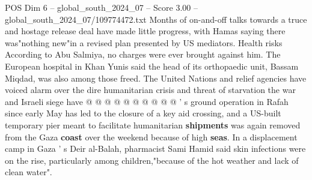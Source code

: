 \begin{textsample}{POS Dim 6 – global\_south\_2024\_07 – Score 3.00 – global\_south\_2024\_07/109774472.txt}
Months of on-and-off talks towards a truce and hostage release deal have made little progress, with Hamas saying there was"nothing new"in a revised plan presented by US mediators.
Health risks According to Abu Salmiya, no charges were ever brought against him.
The European hospital in Khan Yunis said the head of its orthopaedic unit, Bassam Miqdad, was also among those freed.
The United Nations and relief agencies have voiced alarm over the dire humanitarian crisis and threat of starvation the war and Israeli siege have @ @ @ @ @ @ @ @ @ @ ' s ground operation in Rafah since early May has led to the closure of a key aid crossing, and a US-built temporary pier meant to facilitate humanitarian \textbf{shipments} was again removed from the Gaza \textbf{coast} over the weekend because of high \textbf{seas}.
In a displacement camp in Gaza ' s Deir al-Balah, pharmacist Sami Hamid said skin infections were on the rise, particularly among children,"because of the hot weather and lack of clean water".

\end{textsample}
